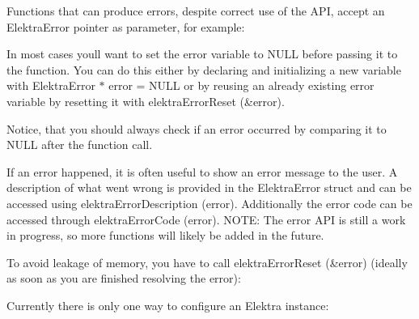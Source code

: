 Functions that can produce errors, despite correct use of the A\+PI, accept an {\ttfamily Elektra\+Error} pointer as parameter, for example\+:


\begin{DoxyCode}{0}
\end{DoxyCode}


In most cases you\textquotesingle{}ll want to set the error variable to {\ttfamily N\+U\+LL} before passing it to the function. You can do this either by declaring and initializing a new variable with {\ttfamily Elektra\+Error $\ast$ error = N\+U\+LL} or by reusing an already existing error variable by resetting it with {\ttfamily elektra\+Error\+Reset (\&error)}.

Notice, that you should always check if an error occurred by comparing it to {\ttfamily N\+U\+LL} after the function call.

If an error happened, it is often useful to show an error message to the user. A description of what went wrong is provided in the {\ttfamily Elektra\+Error} struct and can be accessed using {\ttfamily elektra\+Error\+Description (error)}. Additionally the error code can be accessed through {\ttfamily elektra\+Error\+Code (error)}. N\+O\+TE\+: The error A\+PI is still a work in progress, so more functions will likely be added in the future.

To avoid leakage of memory, you have to call {\ttfamily elektra\+Error\+Reset (\&error)} (ideally as soon as you are finished resolving the error)\+:


\begin{DoxyCode}{0}
\DoxyCodeLine{}
\DoxyCodeLine{\textcolor{comment}{// Call a function and pass the error variable as an argument.}}
\DoxyCodeLine{\textcolor{comment}{// ...}}
\DoxyCodeLine{}
\DoxyCodeLine{\{}
\DoxyCodeLine{}
\DoxyCodeLine{  \textcolor{comment}{// An error occurred, do something about it.}}
\DoxyCodeLine{  \textcolor{comment}{// ...}}
\DoxyCodeLine{}
\DoxyCodeLine{\}}
\end{DoxyCode}


Currently there is only one way to configure an {\ttfamily Elektra} instance\+:


